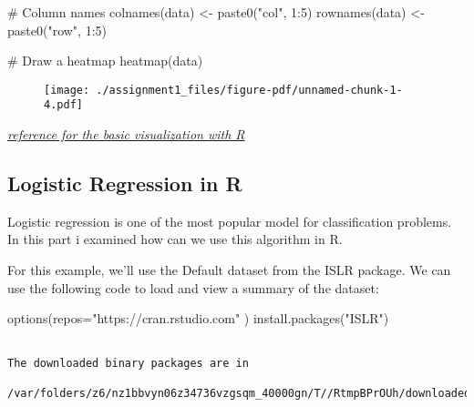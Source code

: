 \documentclass[
  letterpaper,
  DIV=11,
  numbers=noendperiod]{scrreprt}
\newenvironment{Shaded}{\begin{snugshade}}{\end{snugshade}}
\newcommand{\AttributeTok}[1]{\textcolor[rgb]{0.40,0.45,0.13}{#1}}
\newcommand{\CommentTok}[1]{\textcolor[rgb]{0.37,0.37,0.37}{#1}}
\newcommand{\DecValTok}[1]{\textcolor[rgb]{0.68,0.00,0.00}{#1}}
\newcommand{\FunctionTok}[1]{\textcolor[rgb]{0.28,0.35,0.67}{#1}}
\newcommand{\NormalTok}[1]{\textcolor[rgb]{0.00,0.23,0.31}{#1}}
\newcommand{\OtherTok}[1]{\textcolor[rgb]{0.00,0.23,0.31}{#1}}
\newcommand{\SpecialCharTok}[1]{\textcolor[rgb]{0.37,0.37,0.37}{#1}}
\newcommand{\StringTok}[1]{\textcolor[rgb]{0.13,0.47,0.30}{#1}}
\begin{document}
\begin{Shaded}
\begin{Highlighting}[]
\CommentTok{\# Column names}
\FunctionTok{colnames}\NormalTok{(data) }\OtherTok{\textless{}{-}} \FunctionTok{paste0}\NormalTok{(}\StringTok{"col"}\NormalTok{, }\DecValTok{1}\SpecialCharTok{:}\DecValTok{5}\NormalTok{)}
\FunctionTok{rownames}\NormalTok{(data) }\OtherTok{\textless{}{-}} \FunctionTok{paste0}\NormalTok{(}\StringTok{"row"}\NormalTok{, }\DecValTok{1}\SpecialCharTok{:}\DecValTok{5}\NormalTok{)}
  
\CommentTok{\# Draw a heatmap}
\FunctionTok{heatmap}\NormalTok{(data)     }
\end{Highlighting}
\end{Shaded}

\begin{figure}[H]

{\centering \texttt{[image: ./assignment1\_files/figure-pdf/unnamed-chunk-1-4.pdf]}

}

\end{figure}

\href{https://www.geeksforgeeks.org/data-visualization-in-r}{\emph{reference
for the basic visualization with R}}

\hypertarget{logistic-regression-in-r}{%
\subsection{Logistic Regression in R}\label{logistic-regression-in-r}}

Logistic regression is one of the most popular model for classification
problems. In this part i examined how can we use this algorithm in R.

For this example, we'll use the Default dataset from the ISLR package.
We can use the following code to load and view a summary of the dataset:

\begin{Shaded}
\begin{Highlighting}[]
\FunctionTok{options}\NormalTok{(}\AttributeTok{repos=}\StringTok{"https://cran.rstudio.com"}\NormalTok{ )}
\FunctionTok{install.packages}\NormalTok{(}\StringTok{"ISLR"}\NormalTok{)}
\end{Highlighting}
\end{Shaded}

\begin{verbatim}

The downloaded binary packages are in
    /var/folders/z6/nz1bbvyn06z34736vzgsqm_40000gn/T//RtmpBPrOUh/downloaded_packages
\end{verbatim}
\end{document}
